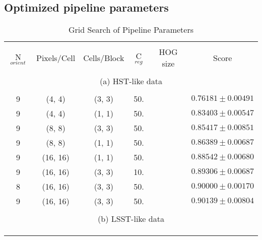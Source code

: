 \documentclass{emulateapj}
\begin{document}
\subsection{Optimized pipeline parameters}\label{sec:gridsearch}

\begin{table}
\caption{Grid Search of Pipeline Parameters}
\begin{center}
\begin{tabular}{cccccc}
\hline \\ [-0.2cm]
N$_{orient}$ & Pixels/Cell & Cells/Block & C$_{reg}$ & HOG size & Score \\ [0.2cm]
\hline \\ [-0.2cm]
\multicolumn{6}{c}{(a) HST-like data} \\ [0.2cm]
\hline \\ [-0.2cm]
9 & (4, 4) & (3, 3) & 50. & &$0.76181\pm0.00491$\\ [0.2cm]
9 & (4, 4) & (1, 1) & 50. & &$0.83403\pm0.00547$\\ [0.2cm]
9 & (8, 8) & (3, 3) & 50. & &$0.85417\pm0.00851$\\ [0.2cm] 
9 & (8, 8) & (1, 1) & 50. & &$0.86389\pm0.00687$\\ [0.2cm] 
9 & (16, 16) & (1, 1) & 50. & & $0.88542\pm0.00680$ \\ [0.2cm]
9 & (16, 16) & (3, 3) & 10. & &$0.89306\pm0.00687$ \\ [0.2cm]
8 & (16, 16) & (3, 3) & 50. & &$0.90000\pm0.00170$ \\ [0.2cm]
9 & (16, 16) & (3, 3) & 50. & &$0.90139\pm0.00804$ \\ [0.2cm]
\hline \\ [-0.2cm]
\multicolumn{6}{c}{(b) LSST-like data} \\ [0.2cm]
\hline \\ [-0.2cm]
& & & & &\\
& & & & &\\ [0.2cm]
\hline
\end{tabular}
\end{center}
\label{tab:gridsearch}
\end{table}
\end{document}
